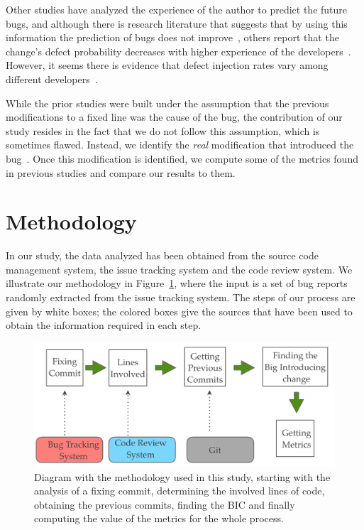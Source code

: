 \documentclass[10pt, conference]{IEEEtran}
\begin{document}
Other studies have analyzed the experience of the author to predict the future bugs, and although there is research literature that suggests that by using this information the prediction of bugs does not improve~\cite{weyuker2010programmer}, others report that the change's defect probability decreases with higher experience of the developers~\cite{mockus2000predicting}. However, it seems there is evidence that defect injection rates vary among different developers~\cite{matsumoto2010analysis}.


While the prior studies were built under the assumption that the previous modifications to a fixed line was the cause of the bug, the contribution of our study resides in the fact that we do not follow this assumption, which is sometimes flawed. Instead, we identify the \emph{real} modification that introduced the bug~\cite{rodriguez2016bugtracking}. Once this modification is identified, we compute some of the metrics found in previous studies and compare our results to them.

\section{Methodology}
\label{sec:methodology}

In our study, the data analyzed has been obtained from the source code management system, the issue tracking system and the code review system. We illustrate our methodology in Figure~\ref{fig:methodology}, where the input is a set of bug reports randomly extracted from the issue tracking system. The steps of our process are given by white boxes; the colored boxes give the sources that have been used to obtain the information required in each step.

\begin{figure}[ht]
\centering
\includegraphics[width=\columnwidth]{methodology.png}
\caption{Diagram with the methodology used in this study, starting with the analysis of a fixing commit, determining the involved lines of code, obtaining the previous commits, finding the BIC and finally computing the value of the metrics for the whole process.}
\label{fig:methodology}       %
\end{figure}
\end{document}

